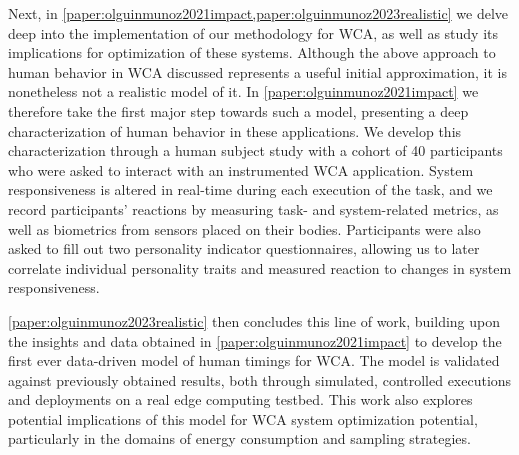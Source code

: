 Next, in \cref{paper:olguinmunoz2021impact,paper:olguinmunoz2023realistic} we delve deep into the implementation of our methodology for \gls{WCA}, as well as study its implications for optimization of these systems.
Although the above approach to human behavior in \gls{WCA} discussed represents a useful initial approximation, it is nonetheless not a realistic model of it.
In \cref{paper:olguinmunoz2021impact} we therefore take the first major step towards such a model, presenting a deep characterization of human behavior in these applications.
We develop this characterization through a human subject study with a cohort of \num{40} participants who were asked to interact with an instrumented \gls{WCA} application.
System responsiveness is altered in real-time during each execution of the task, and we record participants' reactions by measuring task- and system-related metrics, as well as biometrics from sensors placed on their bodies.
Participants were also asked to fill out two personality indicator questionnaires, allowing us to later correlate individual personality traits and measured reaction to changes in system responsiveness.

\cref{paper:olguinmunoz2023realistic} then concludes this line of work, building upon the insights and data obtained in \cref{paper:olguinmunoz2021impact} to develop the first ever data-driven model of human timings for \gls{WCA}.
The model is validated against previously obtained results, both through simulated, controlled executions and deployments on a real edge computing testbed.
This work also explores potential implications of this model for \gls{WCA} system optimization potential, particularly in the domains of energy consumption and sampling strategies.